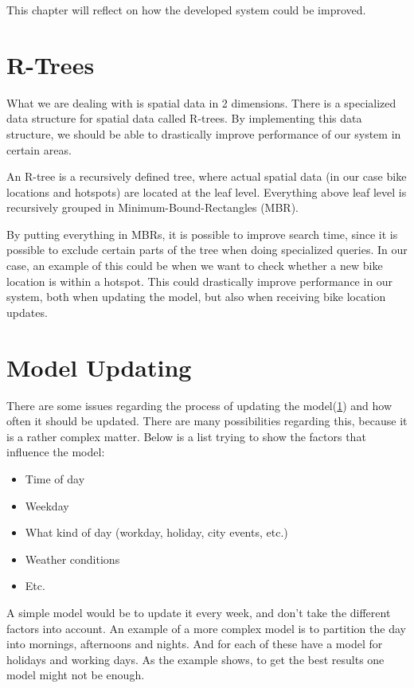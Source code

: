 This chapter will reflect on how the developed system could be improved.

\section{R-Trees}
What we are dealing with is spatial data in 2 dimensions.
There is a specialized data structure for spatial data called R-trees.\cite[Section 25.3.5.3]{database_system_concepts}
By implementing this data structure, we should be able to drastically improve performance of our system in certain areas.

An R-tree is a recursively defined tree, where actual spatial data (in our case bike locations and hotspots) are located at the leaf level.
Everything above leaf level is recursively grouped in Minimum-Bound-Rectangles (MBR).

By putting everything in MBRs, it is possible to improve search time, since it is possible to exclude certain parts of the tree when doing specialized queries.
In our case, an example of this could be when we want to check whether a new bike location is within a hotspot.
This could drastically improve performance in our system, both when updating the model, but also when receiving bike location updates.

\section{Model Updating}\label{reflection:model_updating}
There are some issues regarding the process of updating the model(\cref{}) and how often it should be updated.
There are many possibilities regarding this, because it is a rather complex matter.
Below is a list trying to show the factors that influence the model:
\begin{itemize}
\item Time of day
\item Weekday
\item What kind of day (workday, holiday, city events, etc.)
\item Weather conditions
\item Etc.
\end{itemize}
A simple model would be to update it every week, and don't take the different factors into account.
An example of a more complex model is to partition the day into mornings, afternoons and nights.
And for each of these have a model for holidays and working days.
As the example shows, to get the best results one model might not be enough. 

